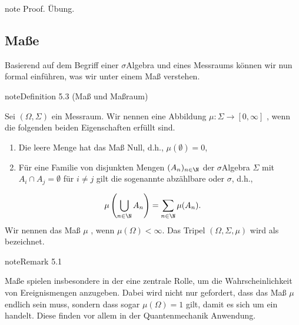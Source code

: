 \documentclass[letterpaper,10pt,german]{jupyterBook}
\begin{document}
\begin{sphinxadmonition}{note}
\sphinxAtStartPar
Proof. Übung.
\end{sphinxadmonition}


\subsection{Maße}
\label{\detokenize{masstheorie/masstheorie:masze}}
\sphinxAtStartPar
Basierend auf dem Begriff einer \(\sigma\)\sphinxhyphen{}Algebra und eines Messraums können wir nun formal einführen, was wir unter einem Maß verstehen.
\label{masstheorie/masstheorie:def:mass}
\begin{sphinxadmonition}{note}{Definition 5.3 (Maß und Maßraum)}



\sphinxAtStartPar
Sei \((\Omega, \Sigma)\) ein Messraum.
Wir nennen eine Abbildung \(\mu: \Sigma\to [0, \infty]\) , wenn die folgenden beiden Eigenschaften erfüllt sind.
\begin{enumerate}
%
\item {} 
\sphinxAtStartPar
Die leere Menge hat das Maß Null, d.h., \(\mu(\emptyset) = 0\),

\item {} 
\sphinxAtStartPar
Für eine Familie von disjunkten Mengen \((A_n)_{n\in\N}\) der \(\sigma\)\sphinxhyphen{}Algebra \(\Sigma\) mit \(A_i \cap A_j = \emptyset\) für \(i \neq j\) gilt die sogenannte abzählbare oder \(\sigma\)\sphinxhyphen{}, d.h.,

\end{enumerate}
\begin{equation*}
\begin{split}\mu\left( \bigcup_{n\in\N}A_n \right) = \sum_{n\in\N}\mu (A_n).\end{split}
\end{equation*}
\sphinxAtStartPar
Wir nennen das Maß \(\mu\) , wenn \(\mu(\Omega)<\infty\).
Das Tripel \((\Omega, \Sigma, \mu)\) wird als  bezeichnet.
\end{sphinxadmonition}
\label{masstheorie/masstheorie:rem:wahrscheinlichkeitsmass}
\begin{sphinxadmonition}{note}{Remark 5.1}



\sphinxAtStartPar
Maße spielen insbesondere in der  eine zentrale Rolle, um die Wahrscheinlichkeit von Ereignismengen anzugeben.
Dabei wird nicht nur gefordert, dass das Maß \(\mu\) endlich sein muss, sondern dass sogar \(\mu(\Omega)=1\) gilt, damit es sich um ein  handelt.
Diese finden vor allem in der Quantenmechanik Anwendung.
\end{sphinxadmonition}
\end{document}

